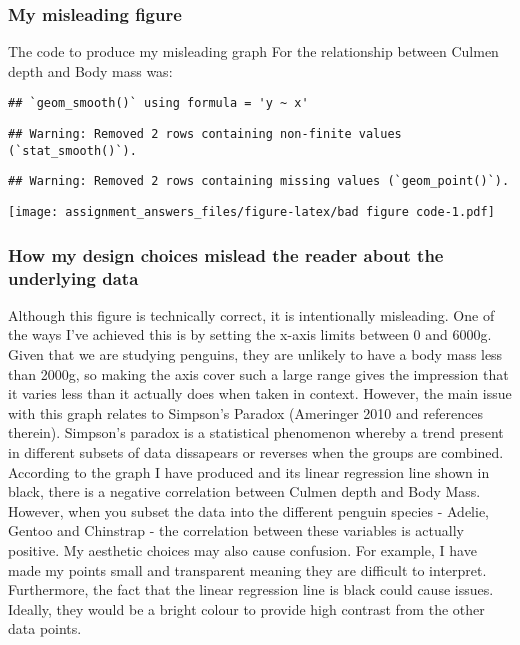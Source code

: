 \documentclass[
]{article}
\begin{document}
\hypertarget{my-misleading-figure}{%
\subsubsection{My misleading figure}\label{my-misleading-figure}}

The code to produce my misleading graph For the relationship between
Culmen depth and Body mass was:

\begin{verbatim}
## `geom_smooth()` using formula = 'y ~ x'
\end{verbatim}

\begin{verbatim}
## Warning: Removed 2 rows containing non-finite values (`stat_smooth()`).
\end{verbatim}

\begin{verbatim}
## Warning: Removed 2 rows containing missing values (`geom_point()`).
\end{verbatim}

\texttt{[image: assignment\_answers\_files/figure-latex/bad figure code-1.pdf]}

\hypertarget{how-my-design-choices-mislead-the-reader-about-the-underlying-data}{%
\subsubsection{How my design choices mislead the reader about the
underlying
data}\label{how-my-design-choices-mislead-the-reader-about-the-underlying-data}}

Although this figure is technically correct, it is intentionally
misleading. One of the ways I've achieved this is by setting the x-axis
limits between 0 and 6000g. Given that we are studying penguins, they
are unlikely to have a body mass less than 2000g, so making the axis
cover such a large range gives the impression that it varies less than
it actually does when taken in context. However, the main issue with
this graph relates to Simpson's Paradox (Ameringer 2010 and references
therein). Simpson's paradox is a statistical phenomenon whereby a trend
present in different subsets of data dissapears or reverses when the
groups are combined. According to the graph I have produced and its
linear regression line shown in black, there is a negative correlation
between Culmen depth and Body Mass. However, when you subset the data
into the different penguin species - Adelie, Gentoo and Chinstrap - the
correlation between these variables is actually positive. My aesthetic
choices may also cause confusion. For example, I have made my points
small and transparent meaning they are difficult to interpret.
Furthermore, the fact that the linear regression line is black could
cause issues. Ideally, they would be a bright colour to provide high
contrast from the other data points.
\end{document}
